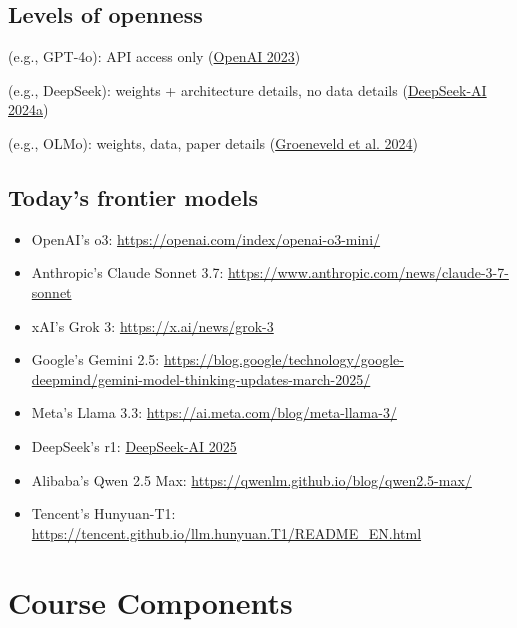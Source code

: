 \subsection*{Levels of openness}
\begin{description}[leftmargin=*]
  \item[Closed models] (e.g., GPT-4o): API access only (\href{https://openai.com/product/gpt-4o}{OpenAI 2023})
  \item[Open-weight models] (e.g., DeepSeek): weights + architecture details, no data details (\href{https://example.com/deepseek-2024a}{DeepSeek-AI 2024a})
  \item[Open-source models] (e.g., OLMo): weights, data, paper details (\href{https://example.com/olmo2-2024}{Groeneveld et al. 2024})
\end{description}

\subsection*{Today's frontier models}
\begin{itemize}[leftmargin=*]
  \item OpenAI's o3: \url{https://openai.com/index/openai-o3-mini/}
  \item Anthropic's Claude Sonnet 3.7: \url{https://www.anthropic.com/news/claude-3-7-sonnet}
  \item xAI's Grok 3: \url{https://x.ai/news/grok-3}
  \item Google's Gemini 2.5: \url{https://blog.google/technology/google-deepmind/gemini-model-thinking-updates-march-2025/}
  \item Meta's Llama 3.3: \url{https://ai.meta.com/blog/meta-llama-3/}
  \item DeepSeek's r1: \href{https://example.com/deepseek-2025}{DeepSeek-AI 2025}
  \item Alibaba's Qwen 2.5 Max: \url{https://qwenlm.github.io/blog/qwen2.5-max/}
  \item Tencent's Hunyuan-T1: \url{https://tencent.github.io/llm.hunyuan.T1/README_EN.html}
\end{itemize}

\clearpage
{\chaptoc\noindent\begin{minipage}[inner sep=0,outer sep=0]{0.9\linewidth}\section{Course Components}\end{minipage}}

